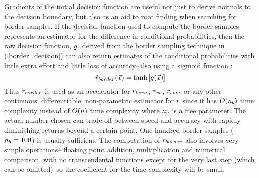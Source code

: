 \documentclass{article}
\begin{document}
Gradients of the initial decision function are useful not just to derive normals to
the decision boundary, but also as an aid to root finding when searching for
border samples. If the decision function used to compute the border samples
represents an estimator for the
difference in conditional probabilities, then the raw decision function,
$g$,
derived from the border sampling technique in (\ref{border_decision})
can also return estimates of the conditional probabilities with little
extra effort and little loss of accuracy--also using a sigmoid function \citep{Mills2011}:
\begin{equation}
	\tilde r_{border}(\vec {x}) = \tanh \left [g (\vec {x}) \right ]
\end{equation}
Thus $\tilde r_{border}$ is used as an accelerator for $\tilde r_{kern}$,
$\tilde r_{vb}$, $\tilde r_{svm}$ or any other 
continuous, differentiable, non-parametric estimator for $r$
since it has $O(n_b)$ time complexity instead of $O(n)$ time
complexity where $n_b$ is a free parameter. The actual number chosen
can trade off between speed and accuracy with rapidly diminishing returns
beyond a certain point. 
One hundred border samples ($n_b=100$) is usually sufficient.
The computation of $\tilde r_{border}$ also involves very simple operations--
floating point addition, multiplication and numerical comparison, with no
transcendental functions except for the very last step (which can be omitted)--so the coefficient for the time complexity will be small.


\end{document}
